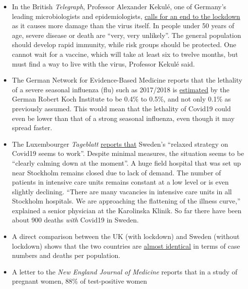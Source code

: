 \begin{itemize}
\tightlist
\item
  In the British \emph{Telegraph}, Professor Alexander Kekulé, one of
  Germany's leading microbiologists and epidemiologists,
  \href{https://www.telegraph.co.uk/news/2020/04/11/german-scientist-predicted-european-epidemic-calls-end-lockdown/}{calls
  for an end to the lockdown} as it causes more damage than the virus
  itself. In people under 50 years of age, severe disease or death are
  ``very, very unlikely''. The general population should develop rapid
  immunity, while risk groups should be protected. One cannot wait for a
  vaccine, which will take at least six to twelve months, but must find
  a way to live with the virus, Professor Kekulé said.
\item
  The German Network for Evidence-Based Medicine reports that the
  lethality of a severe seasonal influenza (flu) such as 2017/2018 is
  \href{https://www.ebm-netzwerk.de/en/publications/covid-19}{estimated}
  by the German Robert Koch Institute to be 0.4\% to 0.5\%, and not only
  0.1\% as previously assumed. This would mean that the lethality of
  Covid19 could even be lower than that of a strong seasonal influenza,
  even though it may spread faster.
\item
  The Luxembourger \emph{Tageblatt}
  \href{https://swprs.files.wordpress.com/2020/04/volksblatt_schweden_corona_20200414_18.pdf}{reports
  that} Sweden's ``relaxed strategy on Covid19 seems to work''. Despite
  minimal measures, the situation seems to be ``clearly calming down at
  the moment''. A huge field hospital that was set up near Stockholm
  remains closed due to lack of demand. The number of patients in
  intensive care units remains constant at a low level or is even
  slightly declining. ``There are many vacancies in intensive care units
  in all Stockholm hospitals. We are approaching the flattening of the
  illness curve,'' explained a senior physician at the Karolinska
  Klinik. So far there have been about 900 deaths \emph{with} Covid19 in
  Sweden.
\item
  A direct comparison between the UK (with lockdown) and Sweden (without
  lockdown) shows that the two countries are
  \href{http://www.theblogmire.com/a-comparison-of-lockdown-uk-with-non-lockdown-sweden/}{almost
  identical} in terms of case numbers and deaths per population.
\item
  A letter to the \emph{New England Journal of Medicine} reports that in
  a study of pregnant women, 88\% of test-positive women

\end{itemize}
